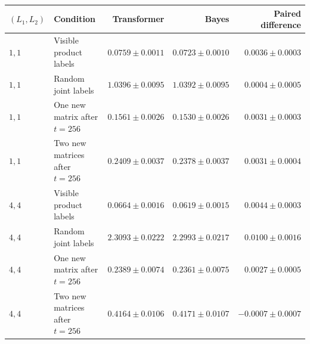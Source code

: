 \begin{tabular}{llrrr}
\toprule
$(L_1,L_2)$ & Condition & Transformer & Bayes & Paired difference \\
\midrule
$1,1$ & Visible product labels & $0.0759\pm 0.0011$ & $0.0723\pm 0.0010$ & $0.0036\pm 0.0003$ \\
$1,1$ & Random joint labels & $1.0396\pm 0.0095$ & $1.0392\pm 0.0095$ & $0.0004\pm 0.0005$ \\
$1,1$ & One new matrix after $t=256$ & $0.1561\pm 0.0026$ & $0.1530\pm 0.0026$ & $0.0031\pm 0.0003$ \\
$1,1$ & Two new matrices after $t=256$ & $0.2409\pm 0.0037$ & $0.2378\pm 0.0037$ & $0.0031\pm 0.0004$ \\
$4,4$ & Visible product labels & $0.0664\pm 0.0016$ & $0.0619\pm 0.0015$ & $0.0044\pm 0.0003$ \\
$4,4$ & Random joint labels & $2.3093\pm 0.0222$ & $2.2993\pm 0.0217$ & $0.0100\pm 0.0016$ \\
$4,4$ & One new matrix after $t=256$ & $0.2389\pm 0.0074$ & $0.2361\pm 0.0075$ & $0.0027\pm 0.0005$ \\
$4,4$ & Two new matrices after $t=256$ & $0.4164\pm 0.0106$ & $0.4171\pm 0.0107$ & $-0.0007\pm 0.0007$ \\
\bottomrule
\end{tabular}
